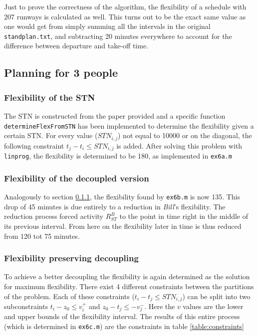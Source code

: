\documentclass[10pt,a4paper]{article}
\begin{document}
Just to prove the correctness of the algorithm, the flexibility of a schedule with 207 runways is calculated as well. This turns out to be the exact same value as one would get from simply summing all the intervals in the original \texttt{standplan.txt}, and subtracting 20 minutes everywhere to account for the difference between departure and take-off time.

\subsection{Planning for 3 people}
\subsubsection{Flexibility of the STN}
\label{sec:flex_boerkoel_1}
The STN is constructed from the paper provided and a specific function \texttt{de\-ter\-mine\-Flex\-From\-STN} has been implemented to determine the flexibility given a certain STN. For every value ($STN_{i,j}$) not equal to 10000 or on the diagonal, the following constraint $t_j - t_i \leq STN_{i,j}$ is added. After solving this problem with \texttt{linprog},  the flexibility is determined to be 180, as implemented in \texttt{ex6a.m}

\subsubsection{Flexibility of the decoupled version}
Analogously to section \ref{sec:flex_boerkoel_1}, the flexibility found by \texttt{ex6b.m} is now 135. This drop of 45 minutes is due entirely to a reduction in \emph{Bill}'s flexibility. The reduction process forced activity $R^{B}_{ST}$ to the point in time right in the middle of its previous interval. From here on the flexibility later in time is thus reduced from 120 tot 75 minutes.

\subsubsection{Flexibility preserving decoupling}
\label{sec:preserving_decoupling}
To achieve a better decoupling the flexibility is again determined as the solution for maximum flexibility. There exist 4 different constraints between the partitions of the problem. Each of these constraints ($t_i - t_j \leq STN_{i,j}$) can be split into two subconstraints $t_i - z_0 \leq v_i^+$ and $z_0 - t_j \leq -v_j^-$. Here the $v$ values are the lower and upper bounds of the flexibility interval. The results of this entire process (which is determined in \texttt{ex6c.m}) are the constraints in table \ref{table:constraints}
\end{document}
